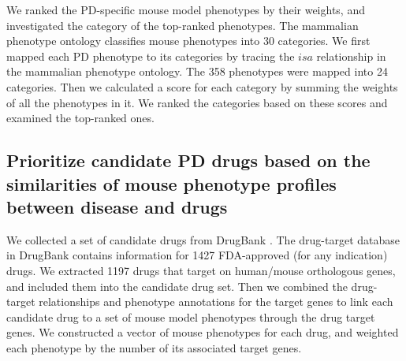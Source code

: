 We ranked the PD-specific mouse model phenotypes by their weights,
and investigated the category of the top-ranked phenotypes.
The mammalian phenotype ontology classifies mouse phenotypes into 30 categories.
We first mapped each PD phenotype to its categories by tracing the $isa$
relationship in the mammalian phenotype ontology. The 358 phenotypes were mapped into 24 categories.
Then we calculated a score for each category by summing the weights of all the phenotypes in it.
We ranked the categories based on these scores and examined the top-ranked ones.

\subsection{Prioritize candidate PD drugs based on the similarities of mouse phenotype profiles between disease and drugs }
We collected a set of candidate drugs from DrugBank \cite{law2014drugbank}.
The drug-target database in DrugBank contains information for 1427 FDA-approved (for any indication) drugs.
We extracted 1197 drugs that target on human/mouse orthologous genes,
and included them into the candidate drug set. Then we combined the drug-target relationships
and phenotype annotations for the target genes to link each candidate drug to a set of
mouse model phenotypes through the drug target genes. We constructed a vector of mouse phenotypes
for each drug, and weighted each phenotype by the number of its associated target genes.


